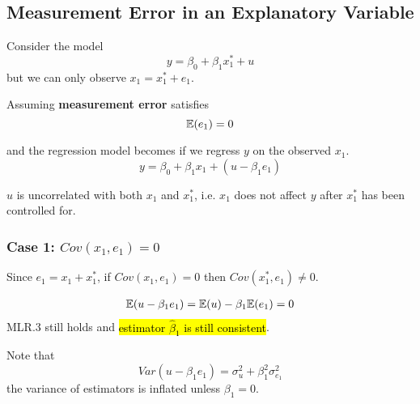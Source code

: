 \documentclass[]{article}
\begin{document}
		\subsection{Measurement Error in an Explanatory Variable}
			\par Consider the model 
			\[
				y = \beta_0 + \beta_1 x_1^{*} + u
			\]
			but we can only observe $x_1 = x_1^{*} + e_1$. 
			
			\begin{assumption}
				Assuming \textbf{measurement error} satisfies
				\[
					\mathbb{E}({e_1}) = 0
				\]
			\end{assumption}
			
			and the regression model becomes if we regress $y$ on the observed $x_1$.
			\begin{equation}
				y = \beta_0 + \beta_1 x_1 + (u - \beta_1 e_1)
			\end{equation}
			\begin{assumption}
				$u$ is uncorrelated with both $x_1$ and $x_1^{*}$, i.e. $x_1$ does not affect $y$ after $x_1^*$ has been controlled for.
			\end{assumption}
			
			\subsubsection{Case 1: $Cov(x_1, e_1) = 0$}
				\begin{remark}
					Since $e_1 = x_1 + x_1^*$, if $Cov(x_1, e_1) = 0$ then $Cov(x_1^*, e_1) \neq 0$.
				\end{remark}
				\begin{remark}
					\begin{gather*}
						\mathbb{E}({u-\beta_1 e_1}) = \mathbb{E}({u}) - \beta_1 \mathbb{E}({e_1}) = 0
					\end{gather*}
					MLR.3 still holds and \hl{estimator $\hat{\beta}_1$ is still consistent}.
				\end{remark}
				
				\begin{remark}
					Note that 
					\[
						Var(u - \beta_1 e_1) = \sigma_u^2 + \beta_1^2 \sigma_{e_1}^2
					\]
					the variance of estimators is inflated unless $\beta_1 = 0$.
				\end{remark}
				
\end{document}
